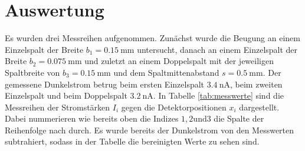 \section{Auswertung}
\label{sec:Auswertung}

Es wurden drei Messreihen aufgenommen. Zunächst wurde die Beugung an einem Einzelspalt
der Breite $b_1 = \SI{0.15}{\milli\meter}$ untersucht, danach an einem Einzelspalt
der Breite $b_2 = \SI{0.075}{\milli\meter}$ und zuletzt an einem Doppelspalt mit
der jeweiligen Spaltbreite von $b_3 = \SI{0.15}{\milli\meter}$ und dem Spaltmittenabstand
$s = \SI{0.5}{\milli\meter}$. Der gemessene Dunkelstrom betrug beim ersten Einzelspalt
$\SI{3.4}{\nano\ampere}$, beim zweiten Einzelspalt und beim Doppelspalt
$\SI{3.2}{\nano\ampere}$. In Tabelle \ref{tab:messwerte} sind die Messreihen der Stromstärken
$I_i$ gegen die Detektorpositionen $x_i$ dargestellt. Dabei nummerieren wie bereits oben die Indizes $1,2 \text{und} 3$ die
Spalte der Reihenfolge nach durch. Es wurde bereits der Dunkelstrom von den Messwerten
subtrahiert, sodass in der Tabelle die bereinigten Werte zu sehen sind.

